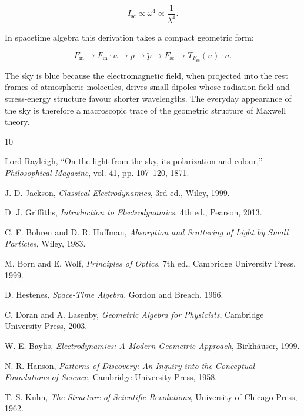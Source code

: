 \documentclass[11pt,a4paper]{article}
\begin{document}
\begin{equation}
I_{\mathrm{sc}}
\propto
\omega^4
\propto
\frac{1}{\lambda^4}.
\end{equation}

In spacetime algebra this derivation takes a compact geometric form:

\begin{equation}
F_{\mathrm{in}}
\rightarrow
F_{\mathrm{in}}\cdot u
\rightarrow
p
\rightarrow
\ddot{p}
\rightarrow
F_{\mathrm{sc}}
\rightarrow
T_{F_{\mathrm{sc}}}(u)\cdot n.
\end{equation}

The sky is blue because the electromagnetic field, when projected into the
rest frames of atmospheric molecules, drives small dipoles whose radiation
field and stress-energy structure favour shorter wavelengths. The everyday
appearance of the sky is therefore a macroscopic trace of the geometric
structure of Maxwell theory.

\begin{thebibliography}{10}

Lord Rayleigh,
``On the light from the sky, its polarization and colour,''
\textit{Philosophical Magazine},
vol. 41, pp. 107--120, 1871.

J. D. Jackson,
\textit{Classical Electrodynamics},
3rd ed.,
Wiley, 1999.

D. J. Griffiths,
\textit{Introduction to Electrodynamics},
4th ed.,
Pearson, 2013.

C. F. Bohren and D. R. Huffman,
\textit{Absorption and Scattering of Light by Small Particles},
Wiley, 1983.

M. Born and E. Wolf,
\textit{Principles of Optics},
7th ed.,
Cambridge University Press, 1999.

D. Hestenes,
\textit{Space-Time Algebra},
Gordon and Breach, 1966.

C. Doran and A. Lasenby,
\textit{Geometric Algebra for Physicists},
Cambridge University Press, 2003.

W. E. Baylis,
\textit{Electrodynamics: A Modern Geometric Approach},
Birkh\"auser, 1999.

N. R. Hanson,
\textit{Patterns of Discovery: An Inquiry into the Conceptual Foundations of Science},
Cambridge University Press, 1958.

T. S. Kuhn,
\textit{The Structure of Scientific Revolutions},
University of Chicago Press, 1962.

\end{thebibliography}
\end{document}
